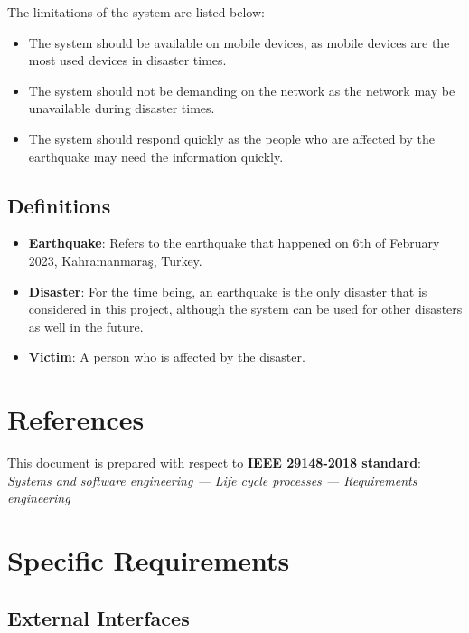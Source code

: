\documentclass[a4paper]{article}
\begin{document}
                The limitations of the system are listed below:
                \begin{itemize}
                    \item The system should be available on mobile devices, as mobile devices are the most used devices in disaster times.
                    \item The system should not be demanding on the network as the network may be unavailable during disaster times.
                    \item The system should respond quickly as the people who are affected by the earthquake may need the information quickly.
                \end{itemize}

            \subsection{Definitions}
            \begin{itemize}
                \item \textbf{Earthquake}: Refers to the earthquake that happened on 6th of February 2023, Kahramanmaraş, Turkey.
                \item \textbf{Disaster}: For the time being, an earthquake is the only disaster that is considered in this project, although the system can be used for other disasters as well in the future.
                \item \textbf{Victim}: A person who is affected by the disaster.
            \end{itemize}

    \section{References}

    This document is prepared with respect to \textbf{IEEE 29148-2018 standard}: \textit{Systems and software engineering — Life cycle processes — Requirements engineering}

    \section{Specific Requirements}
        \subsection{External Interfaces}

\end{document}
